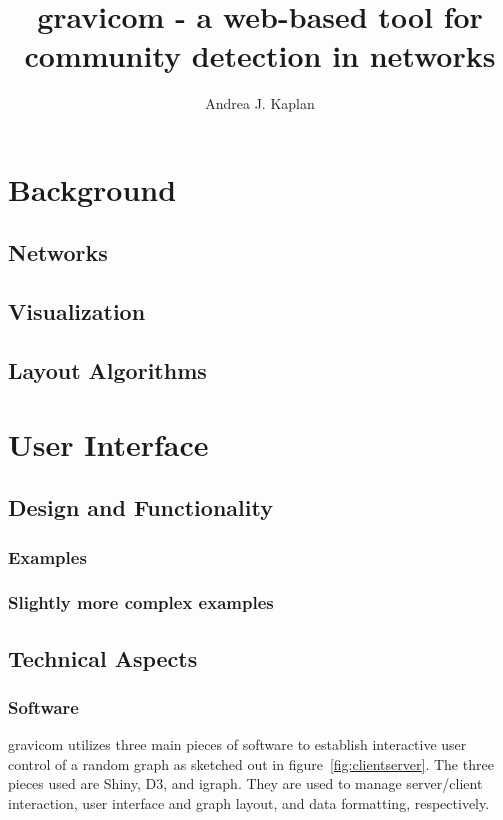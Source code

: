 \documentclass{article}\usepackage[]{graphicx}\usepackage[]{color}
\title{gravicom - a web-based tool for community detection in networks}
\author{Andrea J. Kaplan}
\begin{document}
\maketitle
\section{Background}
\subsection{Networks}
\subsection{Visualization}
\subsection{Layout Algorithms}

\section{User Interface}
\subsection{Design and Functionality}
\subsubsection{Examples}

\subsubsection{Slightly more complex examples}

\subsection{Technical Aspects}
\subsubsection{Software}

gravicom utilizes three main pieces of software to establish interactive user control of a random graph as sketched out in figure~\ref{fig:clientserver}. The three pieces used are Shiny, D3, and igraph. They are used to manage server/client interaction, user interface and graph layout, and data formatting, respectively.
\end{document}
